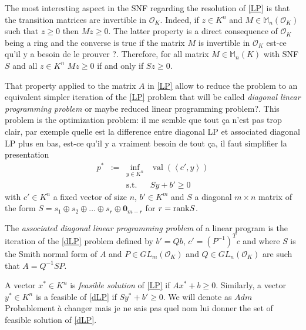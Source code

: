 \documentclass[a4paper,12pt]{article}
\newcommand{\allmat}{\mathbb{M}} %
\newcommand{\simone}[1]{{\color{blue} #1}} %
\newcommand{\corentin}[1]{{\color{red} #1}} %
\DeclareMathOperator{\val}{val}
\newcommand{\OK}{\mathcal{O}_K}
\begin{document}
The most interesting aspect in the SNF regarding the resolution of \ref{LP} is that the transition matrices are invertible in $\OK$. Indeed, if $z \in K^n$ and $M \in \allmat_n(\OK)$ such that $z \geq 0$ then $Mz \geq 0$. The latter property is a direct consequence of $\OK$ being a ring and the converse is true if the matrix $M$ is invertible in $\OK$ \corentin{est-ce qu'il y a besoin de le prouver ?}. Therefore, for all matrix $M \in \allmat_n(K)$ with SNF $S$ and all $z \in K^n$ $Mz \geq 0$ if and only if $Sz \geq 0$. 

That property applied to the matrix $A$ in \ref{LP} allow to reduce the problem to an equivalent simpler iteration of the \ref{LP} problem that will be called \emph{diagonal linear programming problem} \corentin{or maybe reduced linear programming problem?}. This problem is the optimization problem: \simone{il me semble que tout ça n'est pas trop clair, par exemple quelle est la difference entre diagonal LP et associated diagonal LP plus en bas, est-ce qu'il y a vraiment besoin de tout ça, il faut simplifier la presentation}
\begin{equation}
  \tag{dLP}\label{dLP}
\begin{array}{rcll}
  p^* & := & \inf_{y \in K^n} & \val(\left\langle c', y \right\rangle) \\
  &    & \text{s.t.}         & S y + b' \geq 0
\end{array}
\end{equation}
with $c' \in K^n$ a fixed vector of size $n$, $b' \in K^m$ and $S$ a diagonal $m \times n$ matrix of the form $S = s_1 \oplus s_2 \oplus \ldots \oplus s_r \oplus { \bm 0}_{m-r} $ for $r={\rm rank} S$.

The \emph{associated diagonal linear programming problem} of a linear program is the iteration of the \ref{dLP} problem defined by $b' = Qb$, $c' = \left(P^{-1}\right)^T c$ and where $S$ is the Smith normal form of $A$ and $P \in GL_m(\OK)$ and $ Q \in GL_n(\OK)$ are such that $A = Q^{-1} S P$.

A vector $x^* \in K^n$ is \emph{feasible solution} of \ref{LP} if $Ax^* + b \geq 0$. Similarly, a vector $y^* \in K^n$ is a feasible of \ref{dLP} if $Sy^*+b' \geq 0$. We will denote as $Adm$ \corentin{Probablement à changer mais je ne sais pas quel nom lui donner} the set of feasible solution of \ref{dLP}.
\end{document}
